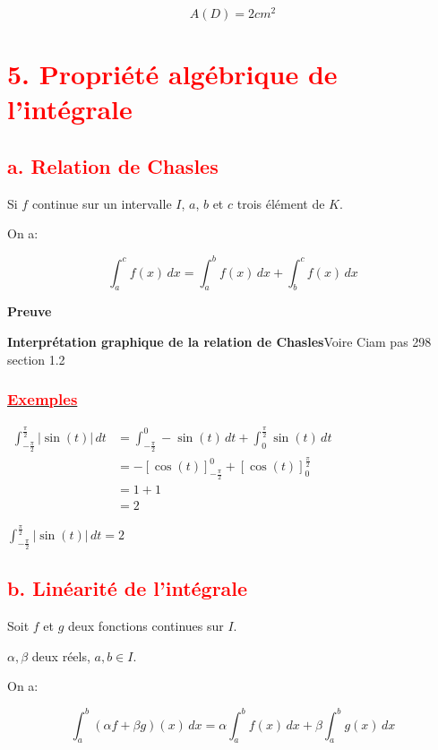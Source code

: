 \documentclass[12pt,a4paper]{article}
\begin{document}
\[\boxed{A(D)=2cm^{2}}\]   

\section*{\textbf{\textcolor{red}{5. Propriété algébrique de l'intégrale}}}
\subsection*{\textbf{\textcolor{red}{a. Relation de Chasles}}}

Si  \( f \) continue sur un intervalle  \( I \), $a$, $b$ et $c$ trois élément de $K$.

On a:

\[
\int_a^c f(x) \, dx = \int_a^b f(x) \, dx + \int_b^c f(x) \, dx
\]


\textbf{Preuve}

\textbf{Interprétation graphique de la relation de Chasles}Voire Ciam pas 298 section 1.2  

\subsubsection*{\underline{\textbf{\textcolor{red}{Exemples}}}}

\(
\begin{aligned}
\int_{-\frac{\pi}{2}}^{\frac{\pi}{2}} \left| \sin(t) \right| \, dt &= \int_{-\frac{\pi}{2}}^{0} -\sin(t) \, dt + \int_{0}^{\frac{\pi}{2}} \sin(t) \, dt\\
&= -\left[\cos(t) \right]_{-\frac{\pi}{2}}^{0} + \left[ \cos(t) \right]_{0}^{\frac{\pi}{2}}\\
&=1+1\\
&=2
\end{aligned}
\)

\( \int_{-\frac{\pi}{2}}^{\frac{\pi}{2}} \left| \sin(t) \right| \, dt = 2 \)

\subsection*{\textbf{\textcolor{red}{b. Linéarité de l'intégrale}}}

Soit \( f \) et \( g \) deux fonctions continues sur \( I \). 

\( \alpha, \beta \) deux réels,  \( a, b \in I \).

On a:

\[
\boxed{\int_a^b \left( \alpha f + \beta g \right)(x) \, dx = \alpha \int_a^b f(x) \, dx + \beta \int_a^b g(x) \, dx}
\]
\end{document}
